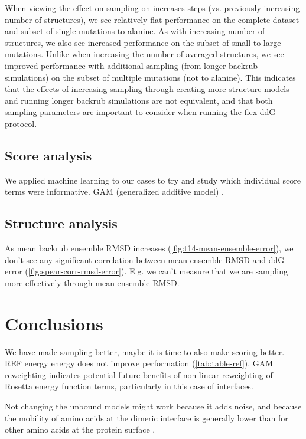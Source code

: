 When viewing the effect on sampling on increases steps (vs. previously increasing number of structures), we see relatively flat performance on the complete dataset and subset of single mutations to alanine.
As with increasing number of structures, we also see increased performance on the subset of small-to-large mutations.
Unlike when increasing the number of averaged structures, we see improved performance with additional sampling (from longer backrub simulations) on the subset of multiple mutations (not to alanine). This indicates that the effects of increasing sampling through creating more structure models and running longer backrub simulations are not equivalent, and that both sampling parameters are important to consider when running the flex ddG protocol.

\subsection{Score analysis}

We applied machine learning to our cases to try and study which individual score terms were informative.
GAM (generalized additive model) \cite{wood_fast_2011}.

\subsection{Structure analysis}

As mean backrub ensemble RMSD increases (\cref{fig:t14-mean-ensemble-error}), we don't see any significant correlation between mean ensemble RMSD and ddG error (\cref{fig:spear-corr-rmsd-error}). E.g. we can't measure that we are sampling more effectively through mean ensemble RMSD.

\section{Conclusions}

We have made sampling better, maybe it is time to also make scoring better. REF energy energy does not improve performation (\cref{tab:table-ref}).
GAM reweighting indicates potential future benefits of non-linear reweighting of Rosetta energy function terms, particularly in this case of interfaces.

Not changing the unbound models might work because it adds noise, and because the mobility of amino acids at the dimeric interface is generally lower than for other amino acids at the protein surface \cite{zen_comparing_2010}.

